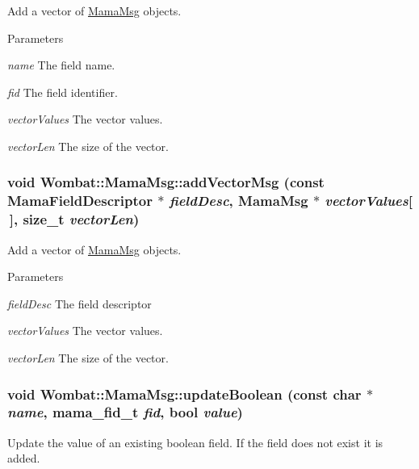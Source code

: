 Add a vector of \hyperlink{classWombat_1_1MamaMsg}{MamaMsg} objects. 
\begin{DoxyParams}{Parameters}
\item[{\em name}]The field name. \item[{\em fid}]The field identifier. \item[{\em vectorValues}]The vector values. \item[{\em vectorLen}]The size of the vector. \end{DoxyParams}
\hypertarget{classWombat_1_1MamaMsg_a644516306b81a3cd8a368b374a39737f}{
\subsubsection[{addVectorMsg}]{\setlength{\rightskip}{0pt plus 5cm}void Wombat::MamaMsg::addVectorMsg (const {\bf MamaFieldDescriptor} $\ast$ {\em fieldDesc}, \/  {\bf MamaMsg} $\ast$ {\em vectorValues}\mbox{[}$\,$\mbox{]}, \/  size\_\-t {\em vectorLen})}}
\label{classWombat_1_1MamaMsg_a644516306b81a3cd8a368b374a39737f}


Add a vector of \hyperlink{classWombat_1_1MamaMsg}{MamaMsg} objects. 
\begin{DoxyParams}{Parameters}
\item[{\em fieldDesc}]The field descriptor \item[{\em vectorValues}]The vector values. \item[{\em vectorLen}]The size of the vector. \end{DoxyParams}
\hypertarget{classWombat_1_1MamaMsg_ae58341b32e813a3f3e3b5e299cf50c1b}{
\subsubsection[{updateBoolean}]{\setlength{\rightskip}{0pt plus 5cm}void Wombat::MamaMsg::updateBoolean (const char $\ast$ {\em name}, \/  mama\_\-fid\_\-t {\em fid}, \/  bool {\em value})}}
\label{classWombat_1_1MamaMsg_ae58341b32e813a3f3e3b5e299cf50c1b}


Update the value of an existing boolean field. If the field does not exist it is added.



